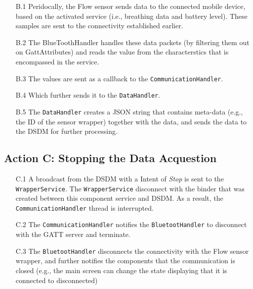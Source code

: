 \begin{itemize}
    \item[B.1] Peridocally, the Flow sensor sends data to the connected mobile device, based on the activated service (i.e., breathing data and battery level). These samples are sent to the connectivity established earlier. 
    \item[B.2]  The BlueToothHandler handles these data packets (by filtering them out on GattAttributes) and reads the value from the characterstics that is encompassed in the service.
    \item[B.3] The values are sent as a callback to the \verb|CommunicationHandler|. 
    \item[B.4] Which further sends it to the \verb|DataHandler|.
    \item[B.5] The \verb|DataHandler| creates a JSON string that contains meta-data (e.g., the ID of the sensor wrapper) together with the data, and sends the data to the DSDM for further processing.    
\end{itemize}


\subsection{Action C: Stopping the Data Acquestion}

\begin{itemize}
    \item[C.1] A broadcast from the DSDM with a Intent of \textit{Stop} is sent to the \verb|WrapperService|. The \verb|WrapperService| disconnect with the binder that was created between this component service and DSDM. As a result, the \verb|CommunicationHandler| thread is interrupted.
    \item[C.2] The \verb|CommunicationHandler| notifies the \verb|BluetootHandler| to disconnect with the GATT server and terminate.
    \item[C.3] The \verb|BluetootHandler| disconnects the connectivity with the Flow sensor wrapper, and further notifies the components that the communication is closed (e.g., the main screen can change the state displaying that it is connected to disconnected) 
\end{itemize}



